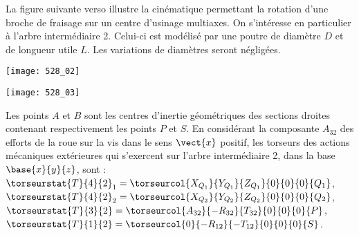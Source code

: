 \normaltrue
\correctionfalse


\setcounter{question}{0}%

\ifcorrection
\else
{}
\fi

\ifprof
\else

La figure suivante verso illustre la cinématique permettant la rotation d'une broche de fraisage sur un centre d'usinage multiaxes.
On s'intéresse en particulier à l'arbre intermédiaire 2. Celui-ci est modélisé  par une poutre de diamètre $D$ et de longueur utile $L$. Les variations de diamètres seront négligées.

\begin{marginfigure}
\texttt{[image: 528\_02]}
\end{marginfigure}


\begin{marginfigure}
\texttt{[image: 528\_03]}
\end{marginfigure}


Les points $A$ et $B$ sont les centres d’inertie géométriques des sections droites contenant
respectivement les points $P$ et $S$.
En considérant la composante $A_{32}$ des efforts de la roue sur la vis dans le sens $\vect{x}$ positif, les
torseurs des actions mécaniques extérieures qui s’exercent sur l’arbre intermédiaire 2, dans la base
$\base{x}{y}{z}$, sont :
$\torseurstat{T}{4}{2}_1 = \torseurcol{X_{Q_1}}{Y_{Q_1}}{Z_{Q_1}}{0}{0}{0}{Q_1}$, 
$\torseurstat{T}{4}{2}_2 = \torseurcol{X_{Q_2}}{Y_{Q_2}}{Z_{Q_2}}{0}{0}{0}{Q_2}$, 
$\torseurstat{T}{3}{2} = \torseurcol{A_{32}}{-R_{32}}{T_{32}}{0}{0}{0}{P}$, 
$\torseurstat{T}{1}{2} = \torseurcol{0}{-R_{12}}{-T_{12}}{0}{0}{0}{S}$.

\fi




